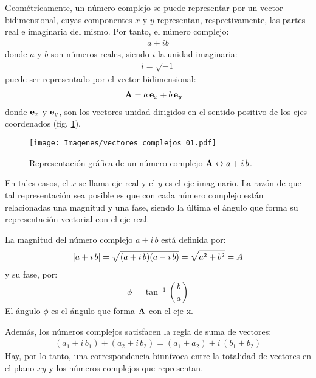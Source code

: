 Geométricamente, un número complejo se puede representar por un vector bidimensional, cuyas componentes $x$ y $y$ representan, respectivamente, 
las partes real e imaginaria del mismo. Por tanto, el número complejo:
\begin{align}
    a + i b
    \label{eq:ecuacion_01_78}
\end{align}
donde $a$ y $b$ son números reales, siendo $i$ la unidad imaginaria:
\begin{align}
    i = \sqrt{-1}
    \label{eq:ecuacion_01_79}
\end{align}
puede ser representado por el vector bidimensional:
\begin{align}
    \vb{A} &= a \, \vb{e}_{x} + b \, \vb{e}_{y}
    \label{eq:ecuacion_01_80}
\end{align}
donde $\vb{e}_{x}$ y $\vb{e}_{y}$, son los vectores unidad dirigidos en el sentido positivo de los ejes coordenados (fig. \ref{fig:figura_01_23}). 
\begin{figure}[H]
    \centering
    \texttt{[image: Imagenes/vectores\_complejos\_01.pdf]}
    \caption{Representación gráfica de un número complejo $\vb{A} \leftrightarrow a + i \, b$.}
    \label{fig:figura_01_23}
\end{figure}
En tales casos, el $x$ se llama eje real y el $y$ es el eje imaginario. La razón de que tal representación sea posible es que con cada número complejo están relacionadas una magnitud y una fase, siendo la última el ángulo que forma su representación vectorial con el eje real.
\par
La magnitud del número complejo $a + i \, b$ está definida por:
\begin{align}
    \abs{a + i \, b} = \sqrt{(a + i \, b) (a - i \, b)} = \sqrt{a^{2} + b^{2}} = A
    \label{eq:ecuacion_01_81}
\end{align}
y su fase, por:
\begin{align}
    \phi = \tan^{-1} \left( \dfrac{b}{a} \right)
    \label{eq:ecuacion_01_82}
\end{align} 
El ángulo $\phi$ es el ángulo que forma $\vb{A}$ con el eje x.
\par
Además, los números complejos satisfacen la regla de suma de vectores:
\begin{align}
    \left( a_{1} + i \, b_{1} \right) + \left( a_{2} + i \, b_{2} \right) = \left( a_{1} + a_{2} \right) + i \, \left( b_{1} + b_{2} \right)
    \label{eq:ecuacion_01_83}
\end{align} 
Hay, por lo tanto, una correspondencia biunívoca entre la totalidad de vectores en el plano $xy$ y los números complejos que representan.

